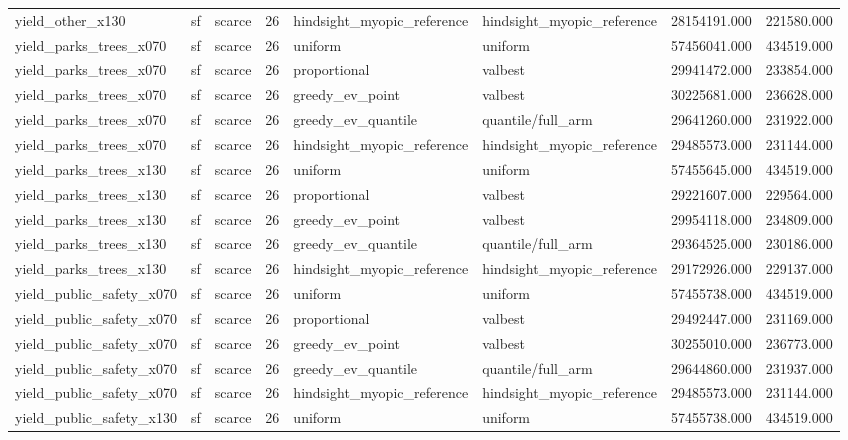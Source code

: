 \begin{tabular}{lllrllrr}
yield\_other\_x130 & sf & scarce & 26 & hindsight\_myopic\_reference & hindsight\_myopic\_reference & 28154191.000 & 221580.000 \\
yield\_parks\_trees\_x070 & sf & scarce & 26 & uniform & uniform & 57456041.000 & 434519.000 \\
yield\_parks\_trees\_x070 & sf & scarce & 26 & proportional & valbest & 29941472.000 & 233854.000 \\
yield\_parks\_trees\_x070 & sf & scarce & 26 & greedy\_ev\_point & valbest & 30225681.000 & 236628.000 \\
yield\_parks\_trees\_x070 & sf & scarce & 26 & greedy\_ev\_quantile & quantile/full\_arm & 29641260.000 & 231922.000 \\
yield\_parks\_trees\_x070 & sf & scarce & 26 & hindsight\_myopic\_reference & hindsight\_myopic\_reference & 29485573.000 & 231144.000 \\
yield\_parks\_trees\_x130 & sf & scarce & 26 & uniform & uniform & 57455645.000 & 434519.000 \\
yield\_parks\_trees\_x130 & sf & scarce & 26 & proportional & valbest & 29221607.000 & 229564.000 \\
yield\_parks\_trees\_x130 & sf & scarce & 26 & greedy\_ev\_point & valbest & 29954118.000 & 234809.000 \\
yield\_parks\_trees\_x130 & sf & scarce & 26 & greedy\_ev\_quantile & quantile/full\_arm & 29364525.000 & 230186.000 \\
yield\_parks\_trees\_x130 & sf & scarce & 26 & hindsight\_myopic\_reference & hindsight\_myopic\_reference & 29172926.000 & 229137.000 \\
yield\_public\_safety\_x070 & sf & scarce & 26 & uniform & uniform & 57455738.000 & 434519.000 \\
yield\_public\_safety\_x070 & sf & scarce & 26 & proportional & valbest & 29492447.000 & 231169.000 \\
yield\_public\_safety\_x070 & sf & scarce & 26 & greedy\_ev\_point & valbest & 30255010.000 & 236773.000 \\
yield\_public\_safety\_x070 & sf & scarce & 26 & greedy\_ev\_quantile & quantile/full\_arm & 29644860.000 & 231937.000 \\
yield\_public\_safety\_x070 & sf & scarce & 26 & hindsight\_myopic\_reference & hindsight\_myopic\_reference & 29485573.000 & 231144.000 \\
yield\_public\_safety\_x130 & sf & scarce & 26 & uniform & uniform & 57455738.000 & 434519.000 \\

\end{tabular}
